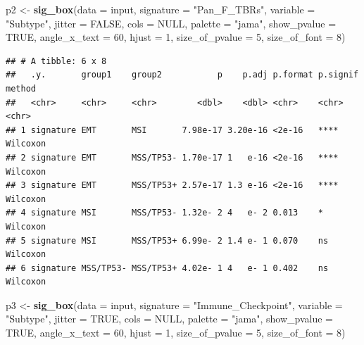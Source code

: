 \documentclass[
  12pt,
]{book}
\newenvironment{Shaded}{\begin{snugshade}}{\end{snugshade}}
\newcommand{\AttributeTok}[1]{\textcolor[rgb]{0.13,0.29,0.53}{#1}}
\newcommand{\ConstantTok}[1]{\textcolor[rgb]{0.56,0.35,0.01}{#1}}
\newcommand{\DecValTok}[1]{\textcolor[rgb]{0.00,0.00,0.81}{#1}}
\newcommand{\FunctionTok}[1]{\textcolor[rgb]{0.13,0.29,0.53}{\textbf{#1}}}
\newcommand{\NormalTok}[1]{#1}
\newcommand{\OtherTok}[1]{\textcolor[rgb]{0.56,0.35,0.01}{#1}}
\newcommand{\StringTok}[1]{\textcolor[rgb]{0.31,0.60,0.02}{#1}}
\theoremstyle{definition}
\theoremstyle{definition}
\theoremstyle{definition}
\theoremstyle{definition}
\theoremstyle{remark}
\begin{document}
\begin{Shaded}
\begin{Highlighting}[]
\NormalTok{p2 }\OtherTok{\textless{}{-}} \FunctionTok{sig\_box}\NormalTok{(}\AttributeTok{data           =}\NormalTok{ input, }
              \AttributeTok{signature      =} \StringTok{"Pan\_F\_TBRs"}\NormalTok{,}
              \AttributeTok{variable       =} \StringTok{"Subtype"}\NormalTok{,}
              \AttributeTok{jitter         =} \ConstantTok{FALSE}\NormalTok{,}
              \AttributeTok{cols           =} \ConstantTok{NULL}\NormalTok{,}
              \AttributeTok{palette        =} \StringTok{"jama"}\NormalTok{,}
              \AttributeTok{show\_pvalue    =} \ConstantTok{TRUE}\NormalTok{,}
              \AttributeTok{angle\_x\_text   =} \DecValTok{60}\NormalTok{, }
              \AttributeTok{hjust          =} \DecValTok{1}\NormalTok{, }
              \AttributeTok{size\_of\_pvalue =} \DecValTok{5}\NormalTok{, }
              \AttributeTok{size\_of\_font   =} \DecValTok{8}\NormalTok{)}
\end{Highlighting}
\end{Shaded}

\begin{verbatim}
## # A tibble: 6 x 8
##   .y.       group1    group2           p    p.adj p.format p.signif method  
##   <chr>     <chr>     <chr>        <dbl>    <dbl> <chr>    <chr>    <chr>   
## 1 signature EMT       MSI       7.98e-17 3.20e-16 <2e-16   ****     Wilcoxon
## 2 signature EMT       MSS/TP53- 1.70e-17 1   e-16 <2e-16   ****     Wilcoxon
## 3 signature EMT       MSS/TP53+ 2.57e-17 1.3 e-16 <2e-16   ****     Wilcoxon
## 4 signature MSI       MSS/TP53- 1.32e- 2 4   e- 2 0.013    *        Wilcoxon
## 5 signature MSI       MSS/TP53+ 6.99e- 2 1.4 e- 1 0.070    ns       Wilcoxon
## 6 signature MSS/TP53- MSS/TP53+ 4.02e- 1 4   e- 1 0.402    ns       Wilcoxon
\end{verbatim}

\begin{Shaded}
\begin{Highlighting}[]
\NormalTok{p3 }\OtherTok{\textless{}{-}} \FunctionTok{sig\_box}\NormalTok{(}\AttributeTok{data           =}\NormalTok{ input, }
              \AttributeTok{signature      =} \StringTok{"Immune\_Checkpoint"}\NormalTok{,}
              \AttributeTok{variable       =} \StringTok{"Subtype"}\NormalTok{,}
              \AttributeTok{jitter          =} \ConstantTok{TRUE}\NormalTok{,}
              \AttributeTok{cols           =} \ConstantTok{NULL}\NormalTok{,}
              \AttributeTok{palette        =} \StringTok{"jama"}\NormalTok{,}
              \AttributeTok{show\_pvalue    =} \ConstantTok{TRUE}\NormalTok{,}
              \AttributeTok{angle\_x\_text   =} \DecValTok{60}\NormalTok{, }
              \AttributeTok{hjust          =} \DecValTok{1}\NormalTok{, }
              \AttributeTok{size\_of\_pvalue =} \DecValTok{5}\NormalTok{, }
              \AttributeTok{size\_of\_font   =} \DecValTok{8}\NormalTok{)}
\end{Highlighting}
\end{Shaded}
\end{document}
